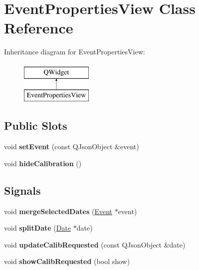 \hypertarget{class_event_properties_view}{\section{Event\-Properties\-View Class Reference}
\label{class_event_properties_view}
}
Inheritance diagram for Event\-Properties\-View\-:\begin{figure}[H]
\begin{center}
\leavevmode
\includegraphics[height=2.000000cm]{class_event_properties_view}
\end{center}
\end{figure}
\subsection*{Public Slots}
\begin{DoxyCompactItemize}
\item 
\hypertarget{class_event_properties_view_a4f5abe6a4d162e7c04ef41712811a89e}{void {\bfseries set\-Event} (const Q\-Json\-Object \&event)}\label{class_event_properties_view_a4f5abe6a4d162e7c04ef41712811a89e}

\item 
\hypertarget{class_event_properties_view_ab4f57a50101dbd4d3bb04e84c761f86b}{void {\bfseries hide\-Calibration} ()}\label{class_event_properties_view_ab4f57a50101dbd4d3bb04e84c761f86b}

\end{DoxyCompactItemize}
\subsection*{Signals}
\begin{DoxyCompactItemize}
\item 
\hypertarget{class_event_properties_view_a5892d313d2625a71b513878651f82a70}{void {\bfseries merge\-Selected\-Dates} (\hyperlink{class_event}{Event} $\ast$event)}\label{class_event_properties_view_a5892d313d2625a71b513878651f82a70}

\item 
\hypertarget{class_event_properties_view_abaeb50a382a4aec0d8a1d47242a41dd6}{void {\bfseries split\-Date} (\hyperlink{class_date}{Date} $\ast$date)}\label{class_event_properties_view_abaeb50a382a4aec0d8a1d47242a41dd6}

\item 
\hypertarget{class_event_properties_view_ae5de1865afd0b86c8a662cf8f0bb56cd}{void {\bfseries update\-Calib\-Requested} (const Q\-Json\-Object \&date)}\label{class_event_properties_view_ae5de1865afd0b86c8a662cf8f0bb56cd}

\item 
\hypertarget{class_event_properties_view_a379eb30967e8b40062690e784bf85b33}{void {\bfseries show\-Calib\-Requested} (bool show)}\label{class_event_properties_view_a379eb30967e8b40062690e784bf85b33}

\end{DoxyCompactItemize}
